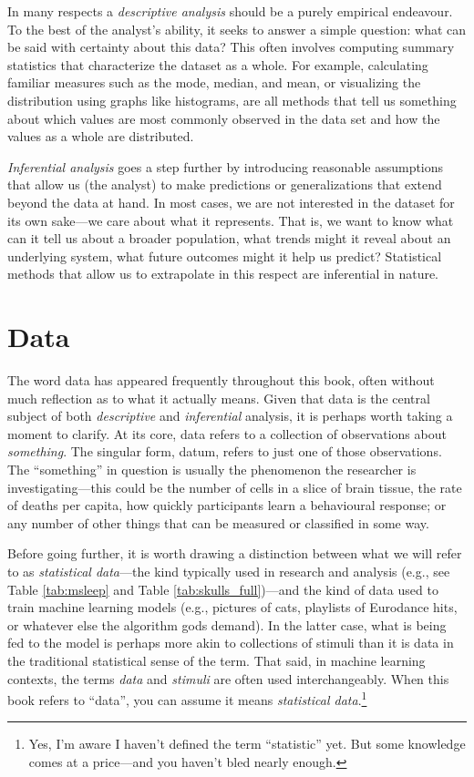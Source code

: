 In many respects a \textit{descriptive analysis} should be a purely empirical endeavour. To the best of the analyst’s ability, it seeks to answer a simple question: what can be said with certainty about this data? This often involves computing summary statistics that characterize the dataset as a whole. For example, calculating familiar measures such as the mode, median, and mean, or visualizing the distribution using graphs like histograms, are all methods that tell us something about which values are most commonly observed in the data set and how the values as a whole are distributed.

\textit{Inferential analysis} goes a step further by introducing reasonable assumptions that allow us (the analyst) to make predictions or generalizations that extend beyond the data at hand. In most cases, we are not interested in the dataset for its own sake—we care about what it represents. That is, we want to know what can it tell us about a broader population, what trends might it reveal about an underlying system, what future outcomes might it help us predict? Statistical methods that allow us to extrapolate in this respect are inferential in nature.

\section{Data}

The word data has appeared frequently throughout this book, often without much reflection as to what it actually means. Given that data is the central subject of both \textit{descriptive} and \textit{inferential} analysis, it is perhaps worth taking a moment to clarify. At its core, \gls{data} refers to a collection of observations about \textit{something}. The singular form, \gls{datum}, refers to just one of those observations. The ``something'' in question is usually the phenomenon the researcher is investigating—this could be the number of cells in a slice of brain tissue, the rate of deaths per capita, how quickly participants learn a behavioural response; or any number of other things that can be measured or classified in some way. 

Before going further, it is worth drawing a distinction between what we will refer to as \textit{statistical data}—the kind typically used in research and analysis (e.g., see Table \ref{tab:msleep} and Table \ref{tab:skulls_full})—and the kind of data used to train machine learning models (e.g., pictures of cats, playlists of Eurodance hits, or whatever else the algorithm gods demand). In the latter case, what is being fed to the model is perhaps more akin to collections of stimuli than it is data in the traditional statistical sense of the term. That said, in machine learning contexts, the terms \textit{data} and \textit{stimuli} are often used interchangeably. When this book refers to ``data'', you can assume it means \textit{statistical data}.\footnote{Yes, I’m aware I haven’t defined the term ``statistic'' yet. But some knowledge comes at a price—and you haven’t bled nearly enough.}

